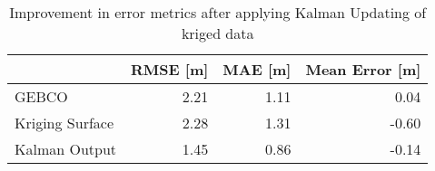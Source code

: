 \begin{table}
\centering
\caption{Improvement in error metrics after applying Kalman Updating of kriged data}
\label{tab:florida_keys_gebco_raster_error}
\begin{tabular}{lrrr}
\toprule
 & RMSE [m] & MAE [m] & Mean Error [m] \\
\midrule
GEBCO & 2.21 & 1.11 & 0.04 \\
Kriging Surface & 2.28 & 1.31 & -0.60 \\
Kalman Output & 1.45 & 0.86 & -0.14 \\
\bottomrule
\end{tabular}
\end{table}
